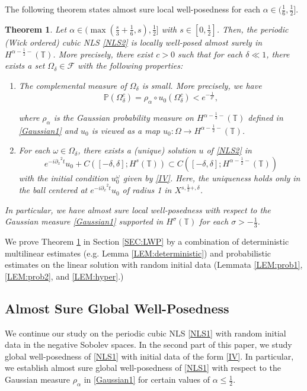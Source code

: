 \documentclass[11pt]{amsart}
\newtheorem{maintheorem}{Theorem}
\numberwithin{equation}{section} \numberwithin{theorem}{section}
\begin{document}
 The following theorem states almost sure local well-posedness for each ${\alpha} \in (\frac{1}{6}, \frac{1}{2}].$
\begin{maintheorem}
	\label{THM:LWP} Let ${\alpha} \in ( \max( \frac{s}{3} + \frac{1}{6}, s), \frac{1}{2}]$ with $ s \in [0, \frac{1}{2}]$. Then, the periodic (Wick ordered) cubic NLS \eqref{NLS2} is locally well-posed almost surely in $H^{{\alpha} - \frac{1}{2}-}(\mathbb{T})$. More precisely, there exist $c > 0$ such that for each ${\delta} \ll 1$, there exists a set $\Omega_{\delta} \in \mathcal{F}$ with the following properties:
	\begin{enumerate}
		\item[(i)] 
		The complemental measure of $\Omega_{\delta}$ is small. More precisely, we have
		\[\mathbb{P}(\Omega_{\delta}^c) = \rho_{\alpha} \circ u_0(\Omega_{\delta}^c) < e^{-\frac{1}{{\delta}^c}},\]
		
		
		{
\noindent} 
		where $\rho_{\alpha}$ is the Gaussian probability measure on $H^{{\alpha}-\frac{1}{2}-}({\mathbb{T}})$ defined in \eqref{Gaussian1}
		and $u_0$ is viewed as a map $u_0:\Omega \to H^{{\alpha}-\frac{1}{2}-}(\mathbb{T})$.
		
		\item[(ii)] For each $\omega \in \Omega_{\delta}$, there exists a (unique) solution $u$ of \eqref{NLS2} in
		\[e^{-i {
\partial_x}^2 t}u_0 + C([-{\delta}, {\delta}];H^{s}(\mathbb{T})) \subset C([-{\delta}, {\delta}];H^{{\alpha} - \frac{1}{2}-}(\mathbb{T}))\]
		with the initial condition $u_0^\omega$ given by \eqref{IV}. 
		Here, the uniqueness holds only in the ball centered at $e^{-i {
\partial_x}^2 t}u_0$ of radius 1 in $X^{s, \frac{1}{2}+,{\delta}}$.
	\end{enumerate}
	
	{
\noindent} In particular, we have almost sure local well-posedness with respect to the Gaussian measure \eqref{Gaussian1} supported in $H^{\sigma}(\mathbb{T})$ for each ${\sigma} > -\frac{1}{3}$. 
\end{maintheorem}

{
\noindent}
We prove Theorem \ref{THM:LWP} in Section \ref{SEC:LWP}
by a combination of deterministic multilinear estimates (e.g. Lemma \ref{LEM:deterministic})
and probabilistic estimates on the linear solution with random initial data (Lemmata \ref{LEM:prob1}, \ref{LEM:prob2}, and \ref{LEM:hyper}.) 

\subsection{Almost Sure Global Well-Posedness} \label{SUBSEC:1GWP}
We continue our study  on the periodic cubic NLS \eqref{NLS1} with random initial data in the negative Sobolev spaces. 
In the second part of this paper, we study global well-posedness of  \eqref{NLS1} 
with initial data of the form \eqref{IV}.
In particular, we establish almost sure global well-posedness of  \eqref{NLS1} 
with respect to the Gaussian measure $\rho_{\alpha}$ in \eqref{Gaussian1}
for certain values of ${\alpha} \leq \frac{1}{2}$.
\end{document}
